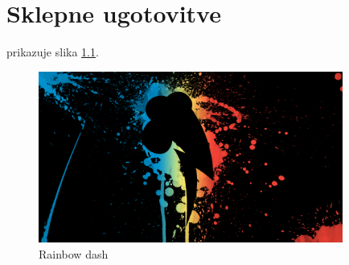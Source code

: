 \chapter{Sklepne ugotovitve}


prikazuje slika \ref{drevo}. 

\begin{figure}
\begin{center}
\includegraphics[width=10cm]{pic/T2FnHj6.png}
\end{center}
\caption{Rainbow dash}
\label{drevo}
\end{figure} 


